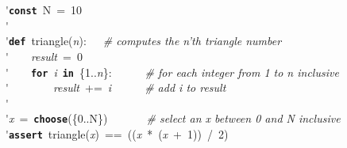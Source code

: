 \'\>\texttt{\textbf{const}}~N~=~10\\

\'\>\\

\'\>\texttt{\textbf{def}}~triangle(\textit{n}):~~~\emph{\# computes the n'th triangle number}\\

\'\>~~~~\textit{result}~=~0\\

\'\>~~~~\texttt{\textbf{for}}~\textit{i}~\texttt{\textbf{in}}~\{1..\textit{n}\}:~~~~~~\emph{\# for each integer from 1 to n inclusive}\\

\'\>~~~~~~~~\textit{result}~+=~\textit{i}~~~~~~\emph{\# add i to result}\\

\'\>\\

\'\>\textit{x}~=~\texttt{\textbf{choose}}(\{0..N\})~~~~~~~\emph{\# select an x between 0 and N inclusive}\\

\'\>\texttt{\textbf{assert}}~triangle(\textit{x})~==~((\textit{x}~*~(\textit{x}~+~1))~/~2)